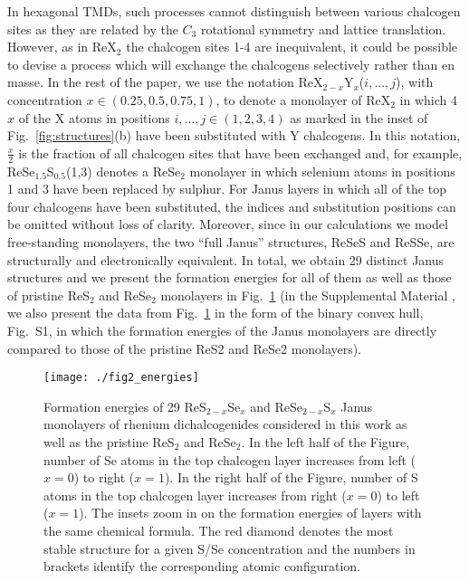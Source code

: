 \documentclass[reprint, superscriptaddress, amsmath,amssymb,prb,twocolumn]{revtex4-2}
\def\SSex{ReS$_{2-x}$Se$_x$}
\def\SeSx{ReSe$_{2-x}$S$_x$}
\begin{document}
In hexagonal TMDs, such processes cannot distinguish between various chalcogen sites as they are related by the $C_{3}$ rotational symmetry and lattice translation. However, as in ReX$_{2}$ the chalcogen sites 1-4 are inequivalent, it could be possible to devise a process which will exchange the chalcogens selectively rather than en masse. In the rest of the paper, we use the notation ReX$_{2-x}$Y$_x$($i, ..., j$), with concentration $x\in(0.25,0.5,0.75,1)$, to denote a monolayer of ReX$_2$ in which 4$x$ of the X atoms in positions $i, ..., j\in(1,2,3,4)$ as marked in the inset of Fig.~\ref{fig:structures}(b) have been substituted with Y chalcogens. In this notation, $\tfrac{x}{2}$ is the fraction of all chalcogen sites that have been exchanged and, for example, ReSe$_{1.5}$S$_{0.5}$(1,3) denotes a ReSe$_2$ monolayer in which selenium atoms in positions 1 and 3 have been replaced by sulphur. For Janus layers in which all of the top four chalcogens have been substituted, the indices and substitution positions can be omitted without loss of clarity. Moreover, since in our calculations we model free-standing monolayers, the two ``full Janus'' structures, ReSeS and ReSSe, are structurally and electronically equivalent. In total, we obtain 29 distinct Janus structures and we present the formation energies for all of them as well as those of pristine ReS$_{2}$ and ReSe$_{2}$ monolayers in Fig.~\ref{fig:energies} (in the Supplemental Material \cite{SM}, we also present the data from Fig.~\ref{fig:energies} in the form of the binary convex hull, Fig.~S1, in which the formation energies of the Janus monolayers are directly compared to those of the pristine ReS2 and ReSe2 monolayers).

\begin{figure}[!t]
\begin{center}
\texttt{[image: ./fig2\_energies]}
\caption{Formation energies of 29 \SSex{} and \SeSx{} Janus monolayers of rhenium dichalcogenides considered in this work as well as the pristine ReS$_{2}$ and ReSe$_{2}$. In the left half of the Figure, number of Se atoms in the top chalcogen layer increases from left ($x=0$) to right ($x=1$). In the right half of the Figure, number of S atoms in the top chalcogen layer increases from right ($x=0$) to left ($x=1$). The insets zoom in on the formation energies of layers with the same chemical formula. The red diamond denotes the most stable structure for a given S/Se concentration and the numbers in brackets identify the corresponding atomic configuration.}
\label{fig:energies}
\end{center}
\end{figure}
\end{document}
